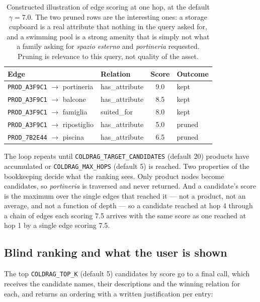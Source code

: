 \begin{table}[htbp]
\centering
\small
\begin{tabular}{llcl}
\hline
\textbf{Edge} & \textbf{Relation} & \textbf{Score} & \textbf{Outcome} \\
\hline
\texttt{PROD\_A3F9C1} $\to$ portineria & has\_attribute & 9.0 & kept \\
\texttt{PROD\_A3F9C1} $\to$ balcone & has\_attribute & 8.5 & kept \\
\texttt{PROD\_A3F9C1} $\to$ famiglia & suited\_for & 8.0 & kept \\
\texttt{PROD\_A3F9C1} $\to$ ripostiglio & has\_attribute & 5.0 & pruned \\
\texttt{PROD\_7B2E44} $\to$ piscina & has\_attribute & 6.5 & pruned \\
\hline
\end{tabular}
\caption{Constructed illustration of edge scoring at one hop, at the default $\gamma = 7.0$. The two pruned rows are the interesting ones: a storage cupboard is a real attribute that nothing in the query asked for, and a swimming pool is a strong amenity that is simply not what a family asking for \emph{spazio esterno} and \emph{portineria} requested. Pruning is relevance to this query, not quality of the asset.}
\label{tab:edge-scoring}
\end{table}

The loop repeats until \texttt{COLDRAG\_TARGET\_CANDIDATES} (default 20) products have accumulated or \texttt{COLDRAG\_MAX\_HOPS} (default 5) is reached. Two properties of the bookkeeping decide what the ranking sees. Only product nodes become candidates, so \emph{portineria} is traversed and never returned. And a candidate's score is the maximum over the single edges that reached it --- not a product, not an average, and not a function of depth --- so a candidate reached at hop 4 through a chain of edges each scoring 7.5 arrives with the same score as one reached at hop 1 by a single edge scoring 7.5.

\subsection{Blind ranking and what the user is shown}

The top \texttt{COLDRAG\_TOP\_K} (default 5) candidates by score go to a final call, which receives the candidate names, their descriptions and the winning relation for each, and returns an ordering with a written justification per entry:

